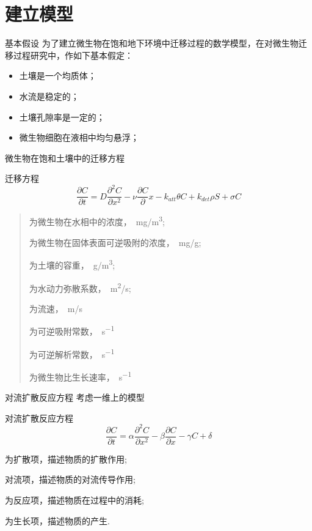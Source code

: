 \documentclass[xcolor=svgnames]{beamer} %
\newenvironment{fsitemize}{\begin{itemize}\fangsong}{\end{itemize}}   %
\begin{document}
\section{建立模型}
	\begin{frame}{基本假设}
	为了建立微生物在饱和地下环境中迁移过程的数学模型，在对微生物迁移过程研究中，作如下基本假定：
	\begin{fsitemize}
	\item 土壤是一个均质体； 
	\item 水流是稳定的； 
	\item 土壤孔隙率是一定的； 
	\item 微生物细胞在液相中均匀悬浮； 
	\end{fsitemize}\par
	\end{frame}
	\begin{frame}{微生物在饱和土壤中的迁移方程}
	\begin{block}{\fangsong 迁移方程}
	\begin{equation}\label{qianyif}
	\dfrac{\partial C}{\partial t}=D\dfrac{\partial^2 C}{\partial x^2}-\nu\dfrac{\partial C}{\partial }x-k_{att}\theta C+k_{det}\rho S+\sigma C
	\end{equation}
	\end{block}
	\begin{quote}
	\begin{description}\setlength{\itemsep}{0em}
	\item[$C$]为微生物在水相中的浓度，\SI{}{mg/m^3};
	\item[$S$]为微生物在固体表面可逆吸附的浓度，\SI{}{mg/g};
	\item[$\rho$]为土壤的容重，\SI{}{g/m^3};
	\item[$D$]为水动力弥散系数，\SI{}{m^2/s};
	\item[$v$]为流速，\SI{}{m/s}
	\item[$k_{att}$]为可逆吸附常数，\SI{}{s^{-1}}
	\item[$k_{det}$]为可逆解析常数，\SI{}{s^{-1}}
	\item[$\sigma$]为微生物比生长速率，\SI{}{s^{-1}}
	\end{description}
	\end{quote}\end{frame}
	\begin{frame}{对流扩散反应方程}
	考虑一维上的模型
	\begin{block}{\fangsong 对流扩散反应方程}
	\begin{equation}
	\dfrac{\partial C}{\partial t}= \alpha\dfrac{\partial^2 C}{\partial x^2}-\beta\dfrac{\partial C}{\partial x}-\gamma C + \delta
	\end{equation}
	\end{block}
	\begin{description}\setlength{\itemsep}{0.4em}
	\item[$\dfrac{\partial^2 C}{\partial x^2}$]为扩散项，描述物质的扩散作用;
	\item[$\dfrac{\partial C}{\partial x}$]对流项，描述物质的对流传导作用;
	\item[$C$]为反应项，描述物质在过程中的消耗;
	\item[$\delta$]为生长项，描述物质的产生.
	\end{description}
	\end{frame}
\end{document}
